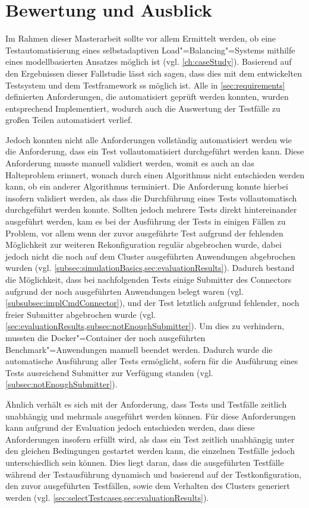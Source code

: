 \section{Bewertung und Ausblick}
\label{sec:outlook}

Im Rahmen dieser Masterarbeit sollte vor allem Ermittelt werden, ob eine Testautomatisierung eines selbstadaptiven Load"=Balancing"=Systems mithilfe eines modellbasierten Ansatzes möglich ist (vgl. \cref{ch:caseStudy}).
Basierend auf den Ergebnissen dieser Fallstudie lässt sich sagen, dass dies mit dem entwickelten Testsystem und dem Testframework \gls{ss} möglich ist.
Alle in \cref{sec:requirements} definierten Anforderungen, die automatisiert geprüft werden konnten, wurden entsprechend Implementiert, wodurch auch die Auswertung der Testfälle zu großen Teilen automatisiert verlief.

Jedoch konnten nicht alle Anforderungen vollständig automatisiert werden wie \zB die Anforderung, dass ein Test vollautomatisiert durchgeführt werden kann.
Diese Anforderung musste manuell validiert werden, womit es auch an das Halteproblem \cite{Turing1937,Turing1938} erinnert, wonach durch einen Algorithmus nicht entschieden werden kann, ob ein anderer Algorithmus terminiert.
Die Anforderung konnte hierbei insofern validiert werden, als dass die Durchführung eines Tests vollautomatisch durchgeführt werden konnte.
Sollten jedoch mehrere Tests direkt hintereinander ausgeführt werden, kam es bei der Ausführung der Tests in einigen Fällen zu Problem, vor allem wenn der zuvor ausgeführte Test aufgrund der fehlenden Möglichkeit zur weiteren Rekonfiguration regulär abgebrochen wurde, dabei jedoch nicht die noch auf dem Cluster ausgeführten Anwendungen abgebrochen wurden (vgl. \cref{subsec:simulationBasics,sec:evaluationResults}).
Dadurch bestand die Möglichkeit, dass bei nachfolgenden Tests einige Submitter des Connectors aufgrund der noch ausgeführten Anwendungen belegt waren (vgl. \cref{subsubsec:implCmdConnector}), und der Test letztlich aufgrund fehlender, noch freier Submitter abgebrochen wurde (vgl. \cref{sec:evaluationResults,subsec:notEnoughSubmitter}).
Um dies zu verhindern, mussten die Docker"=Container der noch ausgeführten Benchmark"=Anwendungen manuell beendet werden.
Dadurch wurde die automatische Ausführung aller Tests ermöglicht, sofern für die Ausführung eines Tests ausreichend Submitter zur Verfügung standen (vgl. \cref{subsec:notEnoughSubmitter}).

Ähnlich verhält es sich mit der Anforderung, dass Tests und Testfälle zeitlich unabhängig und mehrmals ausgeführt werden können.
Für diese Anforderungen kann aufgrund der Evaluation jedoch entschieden werden, dass diese Anforderungen insofern erfüllt wird, als dass ein Test zeitlich unabhängig unter den gleichen Bedingungen gestartet werden kann, die einzelnen Testfälle jedoch unterschiedlich sein können.
Dies liegt daran, dass die ausgeführten Testfälle während der Testausführung dynamisch und basierend auf der Testkonfiguration, den zuvor ausgeführten Testfällen, sowie dem Verhalten des Clusters generiert werden (vgl. \cref{sec:selectTestcases,sec:evaluationResults}).

